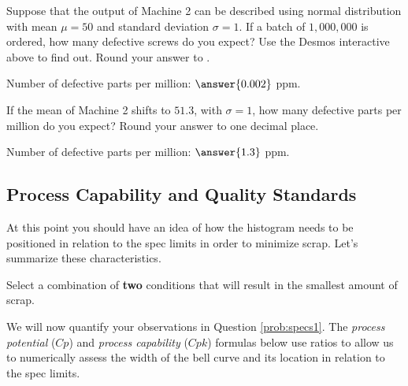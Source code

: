 \documentclass{ximera}
\begin{document}
\begin{question}\label{ex:defParts3}
    Suppose that the output of Machine 2 can be described using normal distribution with mean $\mu=50$ and standard deviation $\sigma=1$.  If a batch of $1,000,000$ is ordered, how many defective screws do you expect?  Use the Desmos interactive above to find out.  Round your answer to .

    Number of defective parts per million: $\answer{0.002}$ ppm.

    If the mean of Machine 2 shifts to $51.3$, with $\sigma =1$, how many defective parts per million do you expect?  Round your answer to one decimal place.

    Number of defective parts per million: $\answer{1.3}$ ppm.
\end{question}

\subsection*{Process Capability and Quality Standards}
At this point you should have an idea of how the histogram needs to be positioned in relation to the spec limits in order to minimize scrap.  Let's summarize these characteristics.  
\begin{question}\label{prob:specs1}
Select a combination of \textbf{two} conditions that will result in the smallest amount of scrap.

    \begin{selectAll}
    \end{selectAll}
\end{question}

We will now quantify your observations in Question \ref{prob:specs1}.  The \emph{process potential} ($Cp$) and \emph{process capability} ($Cpk$) formulas below use ratios to allow us to numerically assess the width of the bell curve and its location in relation to the spec limits.  %
\end{document}
